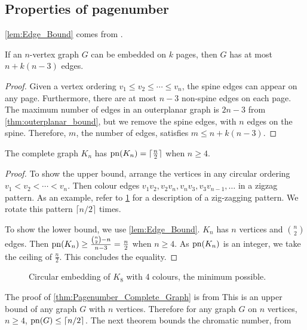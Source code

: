 \subsection{Properties of pagenumber}\label{ssec:Related_Properties}
\cref{lem:Edge_Bound} comes from \textcite{bernhartBookThicknessGraph1979}.
\begin{proposition}\label{lem:Edge_Bound}
	If an \(n\)-vertex graph \(G\) can be embedded on $k$ pages, then \(G\) has at most \(n + k(n-3)\) edges.
\end{proposition}
\begin{proof}
	Given a vertex ordering \(v_1 \leq v_2 \leq \cdots \leq v_n\), the spine edges can appear on any page. Furthermore, there are at most \(n-3\) non-spine edges on each page. The maximum number of edges in an outerplanar graph is \(2n - 3\) from \cref{thm:outerplanar_bound}, but we remove the spine edges, with \(n\) edges on the spine. Therefore, \(m\), the number of edges, satisfies \(m \leq n + k (n - 3)\).
\end{proof}
\begin{proposition}\label{thm:Pagenumber_Complete_Graph}
	The complete graph $K_n$ has $\operatorname{pn}(K_n) = \lceil \frac{n}{2} \rceil$ when $n \geq 4$.
\end{proposition}
\begin{proof}
	To show the upper bound, arrange the vertices in any circular ordering $v_1 < v_2 < \cdots < v_n$. Then colour edges $v_1 v_2, v_2 v_{n}, v_{n} v_{3}, v_{3} v_{n-1}, \ldots$ in a zigzag pattern. As an example, refer to \cref{fig:k8 coloured with colours} for a description of a zig-zagging pattern. We rotate this pattern $\lceil n/2 \rceil$ times. 
	\par
	To show the lower bound, we use \cref{lem:Edge_Bound}. \(K_n\) has \(n\) vertices and \(\binom{n}{2}\) edges. Then \(\operatorname{pn}(K_n) \geq \frac{\binom{n}{2} - n}{n - 3} = \frac{n}{2}\) when \(n \geq 4\). As \(\operatorname{pn}(K_n)\) is an integer, we take the ceiling of \(\frac{n}{2}\). This concludes the equality.
\end{proof}
\begin{figure}[ht]
	\caption{Circular embedding of \(K_8\) with 4 colours, the minimum possible.}
	\centering
	\label{fig:k8 coloured with colours}
\end{figure}
The proof of \cref{thm:Pagenumber_Complete_Graph} is from \textcite{bernhartBookThicknessGraph1979}
This is an upper bound of any graph \(G\) with \(n\) vertices.
Therefore for any graph \(G\) on \(n\) vertices, \(n \geq 4\), \(\operatorname{pn}(G) \leq \lceil n/2 \rceil\). The next theorem bounds the chromatic number, from \textcite{bernhartBookThicknessGraph1979}
